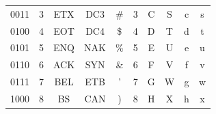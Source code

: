 \begin{table}[h!]
\begin{tabular}{|c|c|cccccccc|}
    0011           & {\color[HTML]{0000FF} 3}   & \multicolumn{1}{c|}{ETX}                      & \multicolumn{1}{c|}{DC3}                      & \multicolumn{1}{c|}{\#}                       & \multicolumn{1}{c|}{3}                        & \multicolumn{1}{c|}{C}                        & \multicolumn{1}{c|}{S}                        & \multicolumn{1}{c|}{c}                        & s                        \\ 
    0100           & {\color[HTML]{0000FF} 4}   & \multicolumn{1}{c|}{EOT}                      & \multicolumn{1}{c|}{DC4}                      & \multicolumn{1}{c|}{\$}                       & \multicolumn{1}{c|}{4}                        & \multicolumn{1}{c|}{D}                        & \multicolumn{1}{c|}{T}                        & \multicolumn{1}{c|}{d}                        & t                        \\ 
    0101           & {\color[HTML]{0000FF} 5}   & \multicolumn{1}{c|}{ENQ}                      & \multicolumn{1}{c|}{NAK}                      & \multicolumn{1}{c|}{\%}                       & \multicolumn{1}{c|}{5}                        & \multicolumn{1}{c|}{E}                        & \multicolumn{1}{c|}{U}                        & \multicolumn{1}{c|}{e}                        & u                        \\ 
    0110           & {\color[HTML]{0000FF} 6}   & \multicolumn{1}{c|}{ACK}                      & \multicolumn{1}{c|}{SYN}                      & \multicolumn{1}{c|}{\&}                       & \multicolumn{1}{c|}{6}                        & \multicolumn{1}{c|}{F}                        & \multicolumn{1}{c|}{V}                        & \multicolumn{1}{c|}{f}                        & v                        \\ 
    0111           & {\color[HTML]{0000FF} 7}   & \multicolumn{1}{c|}{BEL}                      & \multicolumn{1}{c|}{ETB}                      & \multicolumn{1}{c|}{'}                        & \multicolumn{1}{c|}{7}                        & \multicolumn{1}{c|}{G}                        & \multicolumn{1}{c|}{W}                        & \multicolumn{1}{c|}{g}                        & w                        \\ 
    1000           & {\color[HTML]{0000FF} 8}   & \multicolumn{1}{c|}{BS}                       & \multicolumn{1}{c|}{CAN}                      & \multicolumn{1}{c|}{)}                        & \multicolumn{1}{c|}{8}                        & \multicolumn{1}{c|}{H}                        & \multicolumn{1}{c|}{X}                        & \multicolumn{1}{c|}{h}                        & x                        \\ 

\end{tabular}
\end{table}
